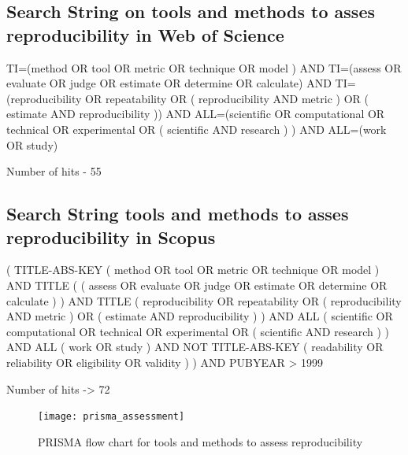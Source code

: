 \documentclass[
10pt, %
a4paper, %
oneside, %
headinclude,footinclude, %
BCOR5mm, %
]{scrartcl}
\begin{document}
\subsection{Search String on tools and methods to asses reproducibility in Web of Science}
TI=(method  OR  tool  OR  metric  OR  technique  OR  model ) AND TI=(assess  OR  evaluate  OR  judge  OR  estimate  OR  determine  OR  calculate) AND TI=(reproducibility  OR  repeatability  OR  ( reproducibility  AND  metric )  OR  ( estimate  AND  reproducibility )) AND ALL=(scientific  OR  computational  OR  technical  OR  experimental  OR  ( scientific  AND  research ) ) AND ALL=(work  OR  study)

Number of hits - 55

\subsection{Search String tools and methods to asses reproducibility in Scopus}
( TITLE-ABS-KEY ( method  OR  tool  OR  metric  OR  technique  OR  model )  AND  TITLE ( ( assess  OR  evaluate  OR  judge  OR  estimate  OR  determine  OR  calculate ) )  AND  TITLE ( reproducibility  OR  repeatability  OR  ( reproducibility  AND  metric )  OR  ( estimate  AND  reproducibility ) )  AND  ALL ( scientific  OR  computational  OR  technical  OR  experimental  OR  ( scientific  AND  research ) )  AND  ALL ( work  OR  study )  AND NOT  TITLE-ABS-KEY ( readability  OR  reliability  OR  eligibility  OR  validity ) )  AND  PUBYEAR  >  1999 

Number of hits -> 72

\begin{figure}[h]
    \centering
    \texttt{[image: prisma\_assessment]}
    \caption{PRISMA flow chart for tools and methods to assess reproducibility}
    \label{fig:PRISMA_chart_tools_and_methods_assess_reproducibility}
\end{figure}
\end{document}
